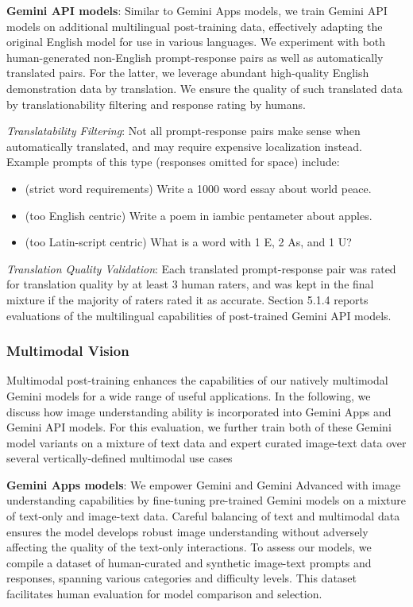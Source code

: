 \textbf{Gemini API models}: Similar to Gemini Apps models, we train Gemini API models on additional multilingual post-training data, effectively adapting the original English model for use in various languages. We experiment with both human-generated non-English prompt-response pairs as well as automatically translated pairs. For the latter, we leverage abundant high-quality English demonstration data by translation. We ensure the quality of such translated data by translationability filtering and response rating by humans.

\emph{Translatability Filtering}: Not all prompt-response pairs make sense when automatically translated, and may require expensive localization instead. Example prompts of this type (responses omitted for space) include:

\begin{itemize}
\item (strict word requirements) Write a 1000 word essay about world peace.
\item (too English centric) Write a poem in iambic pentameter about apples.
\item (too Latin-script centric) What is a word with 1 E, 2 As, and 1 U?
\end{itemize}

\emph{Translation Quality Validation}: Each translated prompt-response pair was rated for translation quality by at least 3 human raters, and was kept in the final mixture if the majority of raters rated it as accurate. Section 5.1.4 reports evaluations of the multilingual capabilities of post-trained Gemini API models.

\subsubsection{Multimodal Vision}

Multimodal post-training enhances the capabilities of our natively multimodal Gemini models for a wide range of useful applications. In the following, we discuss how image understanding ability is incorporated into Gemini Apps and Gemini API models. For this evaluation, we further train both of these Gemini model variants on a mixture of text data and expert curated image-text data over several vertically-defined multimodal use cases

\textbf{Gemini Apps models}: We empower Gemini and Gemini Advanced with image understanding capabilities by fine-tuning pre-trained Gemini models on a mixture of text-only and image-text data. Careful balancing of text and multimodal data ensures the model develops robust image understanding without adversely affecting the quality of the text-only interactions. To assess our models, we compile a dataset of human-curated and synthetic image-text prompts and responses, spanning various categories and difficulty levels. This dataset facilitates human evaluation for model comparison and selection.

